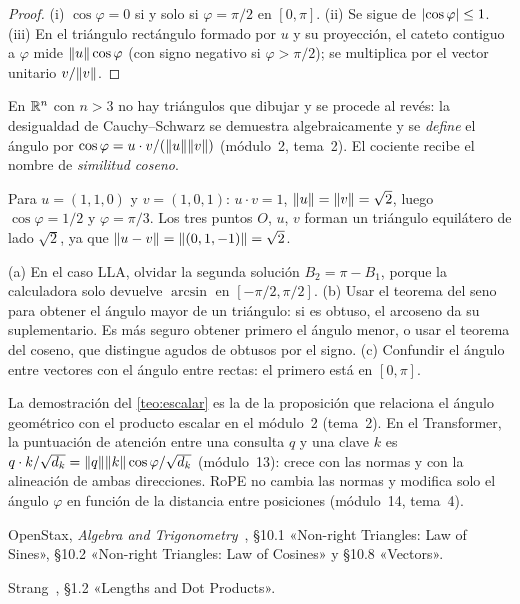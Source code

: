 \begin{proof}
(i) $\cos\varphi=0$ si y solo si $\varphi=\pi/2$ en $[0,\pi]$. (ii) Se sigue de $\lvert\cos\varphi\rvert\le1$. (iii) En el triángulo rectángulo formado por $u$ y su proyección, el cateto contiguo a $\varphi$ mide $\lVert u\rVert\cos\varphi$ (con signo negativo si $\varphi>\pi/2$); se multiplica por el vector unitario $v/\lVert v\rVert$.
\end{proof}

En $\mathbb{R}^{n}$ con $n>3$ no hay triángulos que dibujar y se procede al revés: la desigualdad de Cauchy--Schwarz se demuestra algebraicamente y se \emph{define} el ángulo por $\cos\varphi=u\cdot v/(\lVert u\rVert\lVert v\rVert)$ (módulo~2, tema~2). El cociente recibe el nombre de \emph{similitud coseno}.

\begin{ejemplo}\label{ej:angulo}
Para $u=(1,1,0)$ y $v=(1,0,1)$: $u\cdot v=1$, $\lVert u\rVert=\lVert v\rVert=\sqrt2$, luego $\cos\varphi=1/2$ y $\varphi=\pi/3$. Los tres puntos $O$, $u$, $v$ forman un triángulo equilátero de lado $\sqrt2$, ya que $\lVert u-v\rVert=\lVert(0,1,-1)\rVert=\sqrt2$.
\end{ejemplo}

\begin{observacion}
(a) En el caso LLA, olvidar la segunda solución $B_2=\pi-B_1$, porque la calculadora solo devuelve $\arcsin$ en $[-\pi/2,\pi/2]$. (b) Usar el teorema del seno para obtener el ángulo mayor de un triángulo: si es obtuso, el arcoseno da su suplementario. Es más seguro obtener primero el ángulo menor, o usar el teorema del coseno, que distingue agudos de obtusos por el signo. (c) Confundir el ángulo entre vectores con el ángulo entre rectas: el primero está en $[0,\pi]$.
\end{observacion}

\begin{observacion}
La demostración del \cref{teo:escalar} es la de la proposición que relaciona el ángulo geométrico con el producto escalar en el módulo~2 (tema~2). En el Transformer, la puntuación de atención entre una consulta $q$ y una clave $k$ es $q\cdot k/\sqrt{d_k}=\lVert q\rVert\lVert k\rVert\cos\varphi/\sqrt{d_k}$ (módulo~13): crece con las normas y con la alineación de ambas direcciones. RoPE no cambia las normas y modifica solo el ángulo $\varphi$ en función de la distancia entre posiciones (módulo~14, tema~4).
\end{observacion}

\begin{lecturas}
\item OpenStax, \emph{Algebra and Trigonometry}~\cite{osat}, §10.1 «Non-right Triangles: Law of Sines», §10.2 «Non-right Triangles: Law of Cosines» y §10.8 «Vectors».
\item Strang~\cite{strang}, §1.2 «Lengths and Dot Products».
\end{lecturas}


